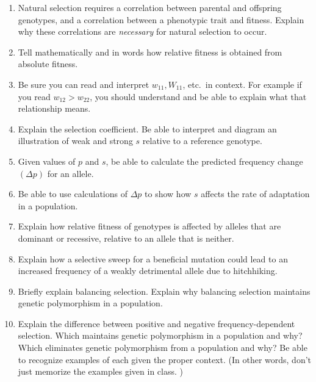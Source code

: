 \documentclass[letterpaper]{tufte-handout}
\begin{document}
\begin{enumerate}
	
	\item Natural selection requires a correlation between parental and offspring genotypes, and a correlation between a phenotypic trait and fitness. Explain why these correlations are \emph{necessary} for natural selection to occur.
	
	\item Tell mathematically and in words how relative fitness is obtained from absolute fitness.
	
	\item Be sure you can read and interpret $w_{11}, W_{11}$, etc.~in context. For example if you read $w_{12} > w_{22}$, you should understand and be able to explain what that relationship means.
	
	\item Explain the selection coefficient. Be able to interpret and diagram an illustration of weak and strong $s$ relative to a reference genotype.
	
	\item Given values of $p$ and $s$, be able to calculate the predicted frequency change $\left(\Delta p\right)$ for an allele.
	
	\item Be able to use calculations of $\Delta p$ to show how $s$ affects the rate of adaptation in a population.
	
	\item Explain how relative fitness of genotypes is affected by alleles that are dominant or recessive, relative to an allele that is neither.
	
	\item Explain how a selective sweep for a beneficial mutation could lead to an increased frequency of a weakly detrimental allele due to hitchhiking.
	
	\item Briefly explain balancing selection. Explain why balancing selection maintains genetic polymorphism in a population.
	
	\item Explain the difference between positive and negative frequency-dependent selection. Which maintains genetic polymorphism in a population and why? Which eliminates genetic polymorphism from a population and why? Be able to recognize examples of each given the proper context. (In other words, don't just memorize the examples given in class. )
	

\end{enumerate}
\end{document}
